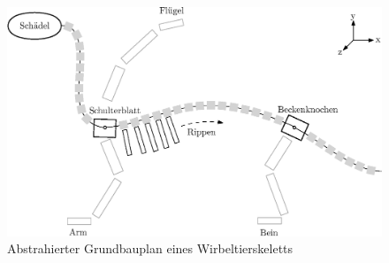 \documentclass{beamer}
\begin{document}
\begin{frame}
 \begin{figure}
  \centering
  \includegraphics[width=\textwidth]{../graphics/skeletonPlan}
  \caption{Abstrahierter Grundbauplan eines Wirbeltierskeletts}
 \end{figure}
\end{frame}
\end{document}
